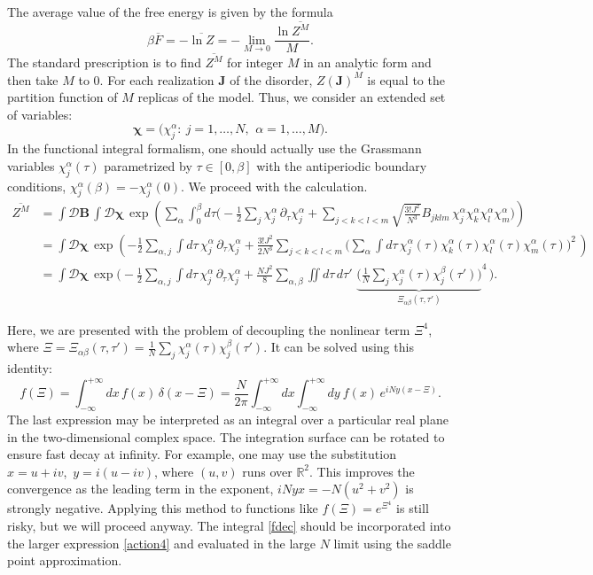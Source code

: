 \documentclass[12pt]{article}
\newcommand*{\V}[1]{\boldsymbol{#1}}
\newcommand{\calD}{\mathcal{D}}
\newcommand{\RR}{\mathbb{R}}
\begin{document}
The average value of the free energy is given by the formula
\begin{equation}
\beta\overline{F}=-\overline{\ln Z}
=-\lim_{M\to 0}\frac{\ln\overline{Z^{M}}}{M}.
\end{equation}
The standard prescription is to find $\overline{Z^{M}}$ for integer $M$ in an analytic form and then take $M$ to $0$. For each realization $\V{J}$ of the disorder, $Z(\V{J})^M$ is equal to the partition function of $M$ replicas of the model. Thus, we consider an extended set of variables:
\begin{equation}
\V{\chi}
=\bigl(\chi_j^\alpha:\: j=1,\dots,N,\:\, \alpha=1,\dots,M\bigr).
\end{equation}
In the functional integral formalism, one should actually use the Grassmann variables $\chi_j^\alpha(\tau)$ parametrized by $\tau\in[0,\beta]$ with the antiperiodic boundary conditions, $\chi_j^\alpha(\beta)=-\chi_j^\alpha(0)$. We proceed with the calculation.
\begin{align}
\nonumber
\overline{Z^M}&=\int\calD\V{B}\,\int\calD\V{\chi}\,
\exp\left(\sum_{\alpha}\int_0^\beta\! d\tau\biggr(
-\frac{1}{2}\sum_{j}\chi_j^\alpha\,\partial_\tau\chi_j^\alpha
+\sum_{j<k<l<m}\sqrt{\tfrac{3!J^2}{N^3}}B_{jklm}\,
\chi_j^\alpha\chi_k^\alpha\chi_l^\alpha\chi_m^\alpha\biggl)\right)
\\[3pt]
\nonumber
&=\int\calD\V{\chi}\, \exp\left(
-\frac{1}{2}\sum_{\alpha,j}\int\!d\tau\,
\chi_j^\alpha\,\partial_\tau\chi_j^\alpha
+\frac{3!J^2}{2N^3}\sum_{j<k<l<m}
\biggl(\sum_{\alpha}\int\!d\tau\,
\chi_j^\alpha(\tau)\chi_k^\alpha(\tau)\chi_l^\alpha(\tau)\chi_m^\alpha(\tau)
{\biggl)\!}^2\, \right)
\\[3pt]
\label{action4}
&=\int\calD\V{\chi}\, \exp\Biggr(
-\frac{1}{2}\sum_{\alpha,j}\int\!d\tau\,
\chi_j^\alpha\,\partial_\tau\chi_j^\alpha
+\frac{NJ^2}{8}\sum_{\alpha,\beta}\iint\!d\tau\,d\tau'\,
{\,\underbrace{\!
\biggl(\frac{1}{N}\sum_{j} \chi_j^\alpha(\tau)\chi_j^\beta(\tau')\biggl)\!}
_{\Xi_{\alpha\beta}(\tau,\tau')}}^4\, \Biggr).
\end{align}

Here, we are presented with the problem of decoupling the nonlinear term $\Xi^4$, where $\Xi=\Xi_{\alpha\beta}(\tau,\tau')=\frac{1}{N}\sum_{j} \chi_j^\alpha(\tau)\chi_j^\beta(\tau')$. It can be solved using this identity:
\begin{equation}\label{fdec}
f(\Xi)=\int_{-\infty}^{+\infty} dx\,f(x)\,\delta(x-\Xi)
=\frac{N}{2\pi}\int_{-\infty}^{+\infty} dx \int_{-\infty}^{+\infty}dy\:
f(x)\,e^{iNy(x-\Xi)}.
\end{equation}
The last expression may be interpreted as an integral over a particular real plane in the two-dimensional complex space. The integration surface can be rotated to ensure fast decay at infinity. For example, one may use the substitution $x=u+iv$,\, $y=i(u-iv)$, where $(u,v)$ runs over $\RR^2$. This improves the convergence as the leading term in the exponent, $iNyx=-N(u^2+v^2)$ is strongly negative. Applying this method to functions like $f(\Xi)=e^{\Xi^4}$ is still risky, but we will proceed anyway. The integral \eqref{fdec} should be incorporated into the larger expression \eqref{action4} and evaluated in the large $N$ limit using the saddle point approximation.
\end{document}
